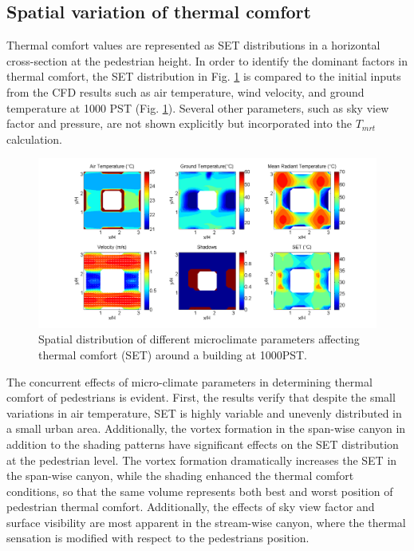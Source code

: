 \documentclass[smallextended]{svjour3}
\begin{document}
\subsection{Spatial variation of thermal comfort}
Thermal comfort values are represented as SET distributions in a horizontal cross-section at the pedestrian height. In order to identify the dominant factors in thermal comfort, the SET distribution in Fig. \ref{Fig.Parameters} is compared to the initial inputs from the CFD results such as air temperature, wind velocity, and ground temperature at 1000 PST (Fig. \ref{Fig.Parameters}). Several other parameters, such as sky view factor and pressure, are not shown explicitly but incorporated into the $T_{mrt}$ calculation.  

\begin{figure}[!h] \centering  
\graphicspath{ {image/} }
\includegraphics[width=\textwidth]{1000PST_flux.png}
\hskip 0.5in
\caption{Spatial distribution of different microclimate parameters affecting thermal comfort (SET) around a building at 1000PST.} 
\label{Fig.Parameters}
\end{figure}

The concurrent effects of micro-climate parameters in determining thermal comfort of pedestrians is evident. First, the results verify that despite the small variations in air temperature, SET is highly variable and unevenly distributed in a small urban area. Additionally, the vortex formation in the span-wise canyon in addition to the shading patterns have significant effects on the SET distribution at the pedestrian level. The vortex formation dramatically increases the SET in the span-wise canyon, while the shading enhanced the thermal comfort conditions, so that the same volume represents both best and worst position of pedestrian thermal comfort. Additionally, the effects of sky view factor and surface visibility are most apparent in the stream-wise canyon, where the thermal sensation is modified with respect to the pedestrians position. 
\end{document}
